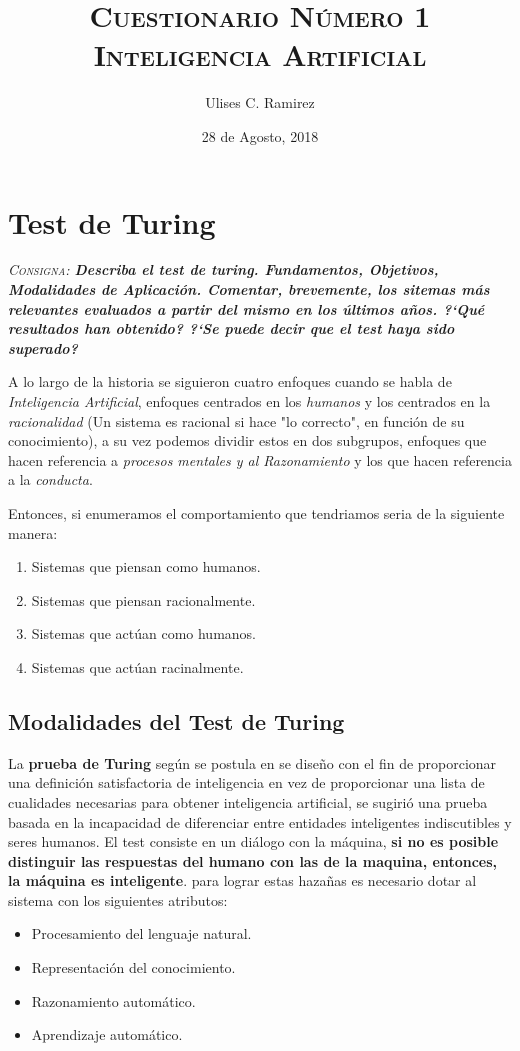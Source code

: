 \documentclass{article}
\title{\textsc{Cuestionario N\'umero 1\\Inteligencia Artificial}}
\author{Ulises C. Ramirez}
\date{28 de Agosto, 2018}
\begin{document}
\maketitle
{}
\newpage
\tableofcontents
{}
\newpage
\section{Test de Turing}
\textit{\textsc{Consigna}: \textbf{Describa el test de turing. Fundamentos, Objetivos, Modalidades de Aplicaci\'on. Comentar, brevemente, los sitemas m\'as relevantes evaluados a partir del mismo en los \'ultimos a\~nos. ?`Qu\'e resultados han obtenido? ?`Se puede decir que el test haya sido superado?}}

A lo largo de la historia se siguieron cuatro enfoques cuando se habla de \textit{Inteligencia Artificial}, enfoques centrados en los \textit{humanos} y los centrados en la \textit{racionalidad} (Un sistema es racional si hace "lo correcto", en funci\'on de su conocimiento), a su vez podemos dividir estos en dos subgrupos, enfoques que hacen referencia a \textit{procesos mentales y al Razonamiento} y los que hacen referencia a la \textit{conducta}.

Entonces, si enumeramos el comportamiento que tendriamos seria de la siguiente manera:
\begin{enumerate}
\item Sistemas que piensan como humanos.
\item Sistemas que piensan racionalmente.
\item Sistemas que act\'uan como humanos.
\item Sistemas que act\'uan racinalmente.
\end{enumerate}

\subsection{Modalidades del Test de Turing}
La \textbf{prueba de Turing} seg\'un se postula en \cite{russel}  se dise\~no con el fin de proporcionar una definici\'on satisfactoria de inteligencia en vez de proporcionar una lista de cualidades necesarias para obtener inteligencia artificial, se sugiri\'o una prueba basada en la incapacidad de diferenciar entre entidades inteligentes indiscutibles y seres humanos. El test consiste en un di\'alogo con la m\'aquina, \textbf{si no es posible distinguir las respuestas del humano con las de la maquina, entonces, la m\'aquina es inteligente}. para lograr estas haza\~nas es necesario dotar al sistema con los siguientes atributos:
\begin{itemize}
\item Procesamiento del lenguaje natural.
\item Representaci\'on del conocimiento.
\item Razonamiento autom\'atico.
\item Aprendizaje autom\'atico.
\end{itemize}
\end{document}
